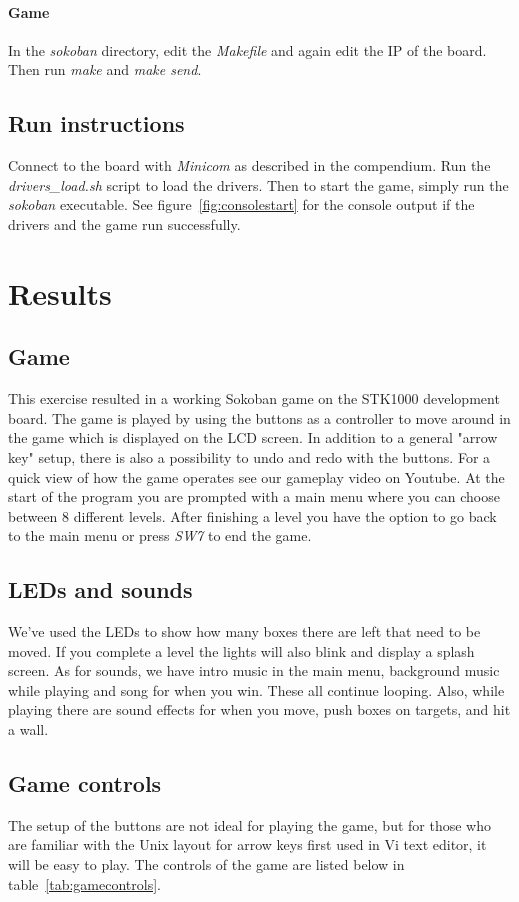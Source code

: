 \documentclass[a4paper,11pt]{article}
\begin{document}
\paragraph{Game}
In the \textit{sokoban} directory, edit the \textit{Makefile} and again edit the IP of the board. Then run \textit{make} and \textit{make send}.

\subsection{Run instructions}
Connect to the board with \textit{Minicom} as described in the compendium. Run the \textit{drivers\_load.sh} script to load the drivers. Then to start the game, simply run the \textit{sokoban} executable. See figure~\ref{fig:consolestart} for the console output if the drivers and the game run successfully. 

\section{Results}
\subsection{Game} 
This exercise resulted in a working Sokoban game on the STK1000 development board. The game is played by using the buttons as a controller to move around in the game which is displayed on the LCD screen. In addition to a general "arrow key" setup, there is also a possibility to undo and redo with the buttons. For a quick view of how the game operates see our gameplay video on Youtube\cite{youtube}. At the start of the program you are prompted with a main menu where you can choose between 8 different levels. After finishing a level you have the option to go back to the main menu or press \textit{SW7} to end the game.

\subsection{LEDs and sounds}
We've used the LEDs to show how many boxes there are left that need to be moved. If you complete a level the lights will also blink and display a splash screen. As for sounds, we have intro music in the main menu, background music while playing and song for when you win. These all continue looping. Also, while playing there are sound effects for when you move, push boxes on targets, and hit a wall.

\subsection{Game controls}
The setup of the buttons are not ideal for playing the game, but for those who are familiar with the Unix layout for arrow keys first used in Vi text editor, it will be easy to play. The controls of the game are listed below in table~\ref{tab:gamecontrols}. 
\end{document}
